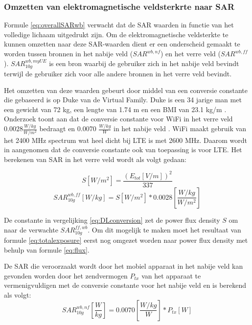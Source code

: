 \documentclass[twocolumn]{phdsymp_dutch}
\begin{document}
\subsubsection{Omzetten van elektromagnetische veldsterkrte naar \gls{SAR}}

Formule \ref{eq:overallSARwb}  verwacht dat de \gls{SAR} waarden in functie van het volledige lichaam uitgedrukt zijn.
Om de elektromagnetische veldsterkte te kunnen omzetten naar deze \gls{SAR}-waarden dient er een onderscheid gemaakt te worden 
tussen bronnen in het nabije veld ($SAR^{wb,nf}$) en het verre veld ($SAR^{wb,ff}$).
$SAR^{wb,myUE}_{10g}$ is een bron waarbij de gebruiker zich in het nabije veld bevindt terwijl 
de gebruiker zich voor alle andere bronnen in het verre veld bevindt.

Het omzetten van deze waarden gebeurt door middel van een conversie constante die gebaseerd is op 
Duke van de Virtual Family. Duke is een 34 jarige man met een gewicht van 72 kg, een lengte van 1.74 m en 
een BMI van 23.1 kg/m \cite{J22_plets2015joint}. 
Onderzoek toont aan dat de conversie constante voor WiFi in het verre veld $0.0028 \frac{W/kg}{W/m^2}$ bedraagt
en  0.0070 $\frac{W/kg}{W}$ in het nabije veld \cite{J22_plets2015joint}.
WiFi maakt gebruik van het 2400 MHz spectrum wat heel  dicht bij \gls{LTE} is met 2600 MHz. Daarom 
wordt in \cite{J22_plets2015joint} aangenomen dat de conversie  constante ook van toepassing is voor \gls{LTE}.
Het berekenen van \gls{SAR} in het verre veld  wordt als volgt gedaan:

\begin{equation}
S [W/m^2]= \frac{(E_{tot} [V/m])^2}{337}
\label{eq:flux}
\end{equation}
\begin{equation}
SAR^{wb,ff}_{10g} [W/kg]= S [W/m^2]* 0.0028 \left[\frac{W/kg}{W/m^2}\right]
\label{eq:DLconversion}
\end{equation}

De constante in vergelijking \ref{eq:DLconversion} zet de \gls{power flux density} $S$ om  naar de verwachte $SAR^{ff,wb}_{10g}$.
Om dit mogelijk te maken moet 
het resultaat van formule \ref{eq:totalexposure} eerst nog omgezet worden naar \gls{power flux density} met behulp van formule
\ref{eq:flux}.

De \gls{SAR} die veroorzaakt wordt door het mobiel apparaat in het nabije veld kan gevonden worden door 
het zendvermogen $P_{tx}$ van het  apparaat te vermenigvuldigen met de conversie constante voor het nabije veld
en is berekend als volgt:
\begin{equation} 
SAR^{wb,nf}_{10g} \left[\frac{W}{kg}\right] = 0.0070 \left[\frac{W/kg}{W}\right] * P_{tx} [W]
\label{eq:ulToSar}
\end{equation}
\end{document}
